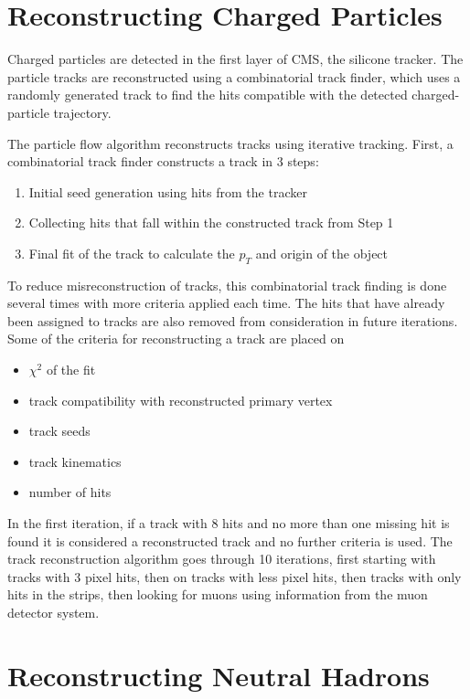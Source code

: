 \section{Reconstructing Charged Particles}


Charged particles are detected in the first layer of CMS, the silicone tracker. The particle tracks are reconstructed using a combinatorial track finder, which uses a randomly generated track to find the hits compatible with the detected charged-particle trajectory. 


The particle flow algorithm reconstructs tracks using iterative tracking. First, a combinatorial track finder constructs a track in 3 steps:

\begin{enumerate}
	\item Initial seed generation using hits from the tracker
	\item Collecting hits that fall within the constructed track from Step 1
	\item Final fit of the track to calculate the $p_T$ and origin of the object
\end{enumerate}




To reduce misreconstruction of tracks, this combinatorial track finding is done several times with more criteria applied each time. The hits that have already been assigned to tracks are also removed from consideration in future iterations. Some of the criteria for reconstructing a track are placed on 


\begin{itemize}
	\item $\chi^2$ of the fit
	\item track compatibility with reconstructed primary vertex
	\item track seeds
	\item track kinematics
	\item number of hits
\end{itemize}

In the first iteration, if a track with 8 hits and no more than one missing hit is found it is considered a reconstructed track and no further criteria is used. The track reconstruction algorithm goes through 10 iterations, first starting with tracks with 3 pixel hits, then on tracks with less pixel hits, then tracks with only hits in the strips, then looking for muons using information from the muon detector system.


\section{Reconstructing Neutral Hadrons}

